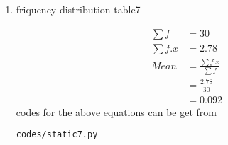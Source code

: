 \renewcommand{\theequation}{\theenumi}
\begin{enumerate}[label=\arabic*.,ref=\thesubsection.\theenumi]
\item \begin{table}[!ht]
	\centering
	
	\caption{friquency distribution table7 }
\end{table}
\begin{align}
\sum{f} &= 30
\\
\sum{f.x} &= 2.78
\\
Mean &= \frac{\sum{f.x}}{\sum{f}}
\\ &= \frac{2.78}{30}
\\&= 0.092
\end{align}
codes for the above equations can be get from
\begin{lstlisting}
codes/static7.py
\end{lstlisting}
\end{enumerate}